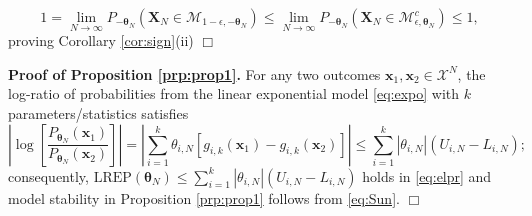 \documentclass[numbib]{imamat}
\theoremstyle{theorem}
\theoremstyle{lemma}
\theoremstyle{example}
\theoremstyle{corollary}
\theoremstyle{definition}
\theoremstyle{remark}
\theoremstyle{approximation}
\theoremstyle{scheme}
\newcommand{\REP}{\mathrm{LREP}}
\begin{document}
\[
1  = \lim_{N\to \infty} P_{-\boldsymbol \theta_N}(\boldsymbol X_N \in \mathcal{M}_{1-\epsilon, -\boldsymbol \theta_N}) \leq \lim_{N\to \infty} P_{-\boldsymbol \theta_N}(\boldsymbol X_N \in \mathcal{M}_{\epsilon, \boldsymbol \theta_N}^c ) \leq 1,
\]
proving Corollary \ref{cor:sign}(ii) \hfill \(\Box\)

\textbf{Proof of Proposition \ref{prp:prop1}.} For any two outcomes \(\boldsymbol x_1, \boldsymbol x_2\in\mathcal{X}^N\), the log-ratio of probabilities from the linear exponential model \eqref{eq:expo} with \(k\) parameters/statistics satisfies
\[
\left|\log \left[ \frac{P_{\boldsymbol \theta_N}(\boldsymbol x_1)}{P_{\boldsymbol \theta_N}(\boldsymbol x_2)}  \right] \right| =
\left|  \sum_{i=1}^k \theta_{i,N} [g_{i,k}(\boldsymbol x_1) - g_{i,k}(\boldsymbol x_2) ] \right|  \leq  \sum_{i=1}^k | \theta_{i,N}| (U_{i,N}-L_{i,N});
\]
consequently, \(\REP(\boldsymbol \theta_N ) \leq \sum_{i=1}^k | \theta_{i,N}| (U_{i,N}-L_{i,N})\) holds in \eqref{eq:elpr} and model stability in Proposition \ref{prp:prop1} follows from \eqref{eq:Sun}. \hfill \(\Box\)
\end{document}
